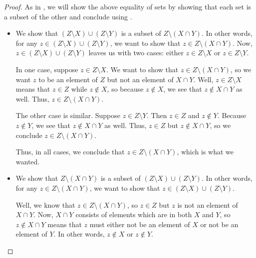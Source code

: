 \documentclass[../notes.tex]{subfiles}
\begin{document}
\begin{proof}
    As in , we will show the above equality of sets by showing that each set is a subset of the other and conclude using .
    \begin{itemize}
        \item We show that $(Z\setminus X)\cup(Z\setminus Y)$ is a subset of $Z\setminus(X\cap Y)$. In other words, for any $z\in(Z\setminus X)\cup(Z\setminus Y)$, we want to show that $z\in Z\setminus(X\cap Y)$. Now, $z\in (Z\setminus X)\cup(Z\setminus Y)$ leaves us with two cases: either $z\in Z\setminus X$ or $z\in Z\setminus Y$.

        In one case, suppose $z\in Z\setminus X$. We want to show that $z\in Z\setminus(X\cap Y)$, so we want $z$ to be an element of $Z$ but not an element of $X\cap Y$. Well, $z\in Z\setminus X$ means that $z\in Z$ while $z\notin X$, so because $z\notin X$, we see that $z\notin X\cap Y$ as well. Thus, $z\in Z\setminus(X\cap Y)$.

        The other case is similar. Suppose $z\in Z\setminus Y$. Then $z\in Z$ and $z\notin Y$. Because $z\notin Y$, we see that $z\notin X\cap Y$ as well. Thus, $z\in Z$ but $z\notin X\cap Y$, so we conclude $z\in Z\setminus(X\cap Y)$.

        Thus, in all cases, we conclude that $z\in Z\setminus(X\cap Y)$, which is what we wanted.
        
        \item We show that $Z\setminus(X\cap Y)$ is a subset of $(Z\setminus X)\cup(Z\setminus Y)$. In other words, for any $z\in Z\setminus(X\cap Y)$, we want to show that $z\in(Z\setminus X)\cup(Z\setminus Y)$.

        Well, we know that $z\in Z\setminus(X\cap Y)$, so $z\in Z$ but $z$ is not an element of $X\cap Y$. Now, $X\cap Y$ consists of elements which are in both $X$ and $Y$, so $z\notin X\cap Y$ means that $z$ must either not be an element of $X$ or not be an element of $Y$. In other words, $z\notin X$ or $z\notin Y$.


\end{itemize}
\end{proof}
\end{document}
